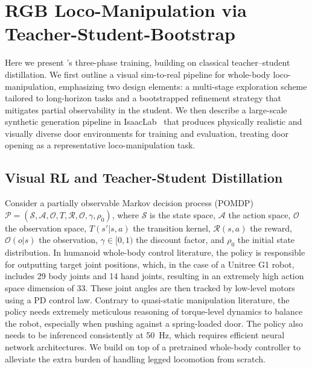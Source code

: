 \section{RGB Loco-Manipulation via Teacher-Student-Bootstrap}
\label{sec:method}




Here we present \method{}'s three-phase training, building on classical teacher–student distillation. We first outline a visual sim-to-real pipeline for whole-body loco-manipulation, emphasizing two design elements: a multi-stage exploration scheme tailored to long-horizon tasks and a bootstrapped refinement strategy that mitigates partial observability in the student. We then describe a large-scale synthetic generation pipeline in IsaacLab~\citep{isaaclab2025} that produces physically realistic and visually diverse door environments for training and evaluation, treating door opening as a representative loco-manipulation task.

\subsection{Visual RL and Teacher-Student Distillation}

 Consider a partially observable Markov decision process (POMDP) $\mathcal{P} = (\mathcal{S}, \mathcal{A}, \mathcal{O}, T, \mathcal{R}, \mathcal{O}, \gamma, \rho_0)$, where $\mathcal{S}$ is the state space, $\mathcal{A}$ the action space, $\mathcal{O}$ the observation space, $T(s'|s,a)$ the transition kernel, $\mathcal{R}(s,a)$ the reward, $\mathcal{O}(o|s)$ the observation, $\gamma\in[0,1)$ the discount factor, and $\rho_0$ the initial state distribution. In humanoid whole-body control literature, the policy is responsible for outputting target joint positions, which, in the case of a Unitree G1 robot, includes 29 body joints and 14 hand joints, resulting in an extremely high action space dimension of 33. These joint angles are then tracked by low-level motors using a PD control law. Contrary to quasi-static manipulation literature, the policy needs extremely meticulous reasoning of torque-level dynamics to balance the robot, especially when pushing against a spring-loaded door. The policy also needs to be inferenced consistently at \SI{50}{\hertz}, which requires efficient neural network architectures. We build \method{} on top of a pretrained whole-body controller \citep{ben2025homie} to alleviate the extra burden of handling legged locomotion from scratch.

